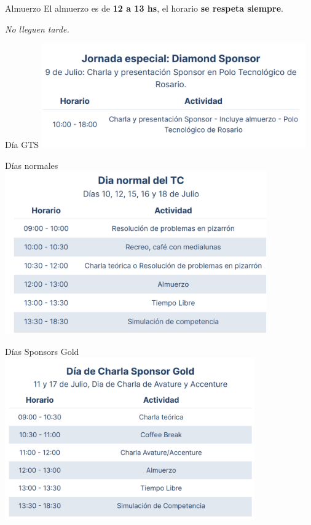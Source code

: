 \documentclass{beamer}
\begin{document}
\begin{frame}{Almuerzo}
    \centering
    El almuerzo es de {\bfseries 12 a 13 hs}, el horario \textbf{se respeta siempre}.
    
    \textit{No lleguen tarde.}
\end{frame}


\begin{frame}{Día GTS}
    \centering
    \includegraphics[clip,height=4.5cm,keepaspectratio]{img/01_gts.png}
\end{frame}

\begin{frame}{Días normales}
    \centering
    \includegraphics[clip,height=7cm,keepaspectratio]{img/02_normal.png}
\end{frame}


\begin{frame}{Días Sponsors Gold}
    \centering
    \includegraphics[clip,height=7cm,keepaspectratio]{img/03_gold.png}
\end{frame}
\end{document}
